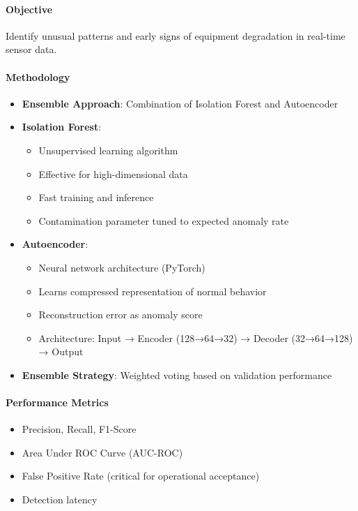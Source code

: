 \documentclass[12pt,a4paper]{article}
\begin{document}
\paragraph{Objective}
Identify unusual patterns and early signs of equipment degradation in real-time sensor data.

\paragraph{Methodology}
\begin{itemize}[leftmargin=*]
    \item \textbf{Ensemble Approach}: Combination of Isolation Forest and Autoencoder
    \item \textbf{Isolation Forest}:
    \begin{itemize}
        \item Unsupervised learning algorithm
        \item Effective for high-dimensional data
        \item Fast training and inference
        \item Contamination parameter tuned to expected anomaly rate
    \end{itemize}
    \item \textbf{Autoencoder}:
    \begin{itemize}
        \item Neural network architecture (PyTorch)
        \item Learns compressed representation of normal behavior
        \item Reconstruction error as anomaly score
        \item Architecture: Input → Encoder (128→64→32) → Decoder (32→64→128) → Output
    \end{itemize}
    \item \textbf{Ensemble Strategy}: Weighted voting based on validation performance
\end{itemize}

\paragraph{Performance Metrics}
\begin{itemize}[leftmargin=*]
    \item Precision, Recall, F1-Score
    \item Area Under ROC Curve (AUC-ROC)
    \item False Positive Rate (critical for operational acceptance)
    \item Detection latency
\end{itemize}
\end{document}

